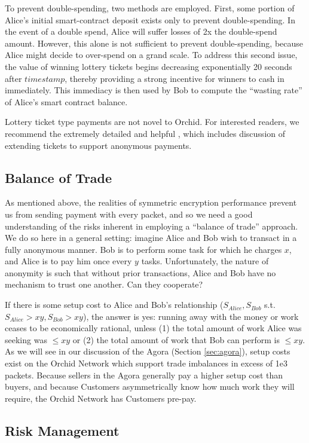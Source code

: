 \documentclass{article}
\newcommand{\mesh}{Orchid}
\begin{document}
To prevent double-spending, two methods are employed. First, some portion of Alice's initial smart-contract deposit exists only to prevent double-spending. In the event of a double spend, Alice will suffer losses of 2x the double-spend amount. However, this alone is not sufficient to prevent double-spending, because Alice might decide to over-spend on a grand scale. To address this second issue, the value of winning lottery tickets begins decreasing exponentially 20 seconds after $timestamp$, thereby providing a strong incentive for winners to cash in immediately. This immediacy is then used by Bob to compute the ``wasting rate'' of Alice's smart contract balance.

Lottery ticket type payments are not novel to \mesh{}. For interested readers, we recommend the extremely detailed and helpful \cite{DAM}, which includes discussion of extending tickets to support anonymous payments.

\subsection{Balance of Trade}
\label{tokens-bot}

As mentioned above, the realities of symmetric encryption performance prevent us from sending payment with every packet, and so we need a good understanding of the risks inherent in employing a ``balance of trade'' approach. We do so here in a general setting: imagine Alice and Bob wish to transact in a fully anonymous manner. Bob is to perform some task for which he charges $x$, and Alice is to pay him once every $y$ tasks. Unfortunately, the nature of anonymity is such that without prior transactions, Alice and Bob have no mechanism to trust one another. Can they cooperate?

If there is some setup cost to Alice and Bob's relationship ($S_{Alice}, S_{Bob}$ s.t. $S_{Alice} > xy, S_{Bob} > xy$), the answer is yes: running away with the money or work ceases to be economically rational, unless (1) the total amount of work Alice was seeking was $\leq xy$ or (2) the total amount of work that Bob can perform is $\leq xy$. As we will see in our discussion of the Agora (Section \ref{sec:agora}), setup costs exist on the \mesh{} Network which support trade imbalances in excess of 1e3 packets. Because sellers in the Agora generally pay a higher setup cost than buyers, and because Customers asymmetrically know how much work they will require, the \mesh{} Network has Customers pre-pay.

\subsection{Risk Management}
\end{document}

